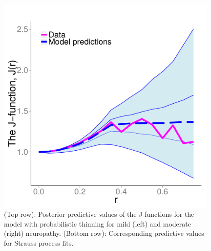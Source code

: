 \documentclass{statsoc}
\begin{document}
  \begin{figure}
  \begin{minipage}[h]{0.24\linewidth}
  \caption[Post Pred]{(Top row): Posterior predictive values of the J-functions for the \matern model with probabilistic thinning for mild (left) and 
  moderate (right) neuropathy. (Bottom row): Corresponding predictive values for Strauss process fits.}
  \label{fig:diab_Jfunc}
  \end{minipage}
  \centering
  \begin{minipage}[h]{0.74\linewidth}
  \begin{minipage}[h]{0.49\linewidth}
  \centering
  \includegraphics[width=0.98\textwidth]{figs/Jfunc_postpred_R10/mild1_prob_full.pdf}
  \end{minipage}
  \begin{minipage}[h]{0.49\linewidth}
  \centering

\end{minipage}
\end{minipage}
\end{figure}
\end{document}
